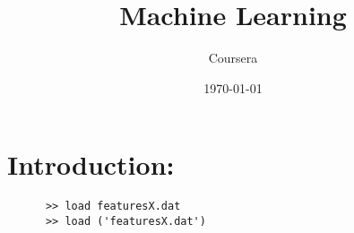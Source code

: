 \documentclass[11pt,a4paper]{article}
\begin{document}
\title{Machine Learning}
\author{Coursera}
\date{\today}
\maketitle


\section{Introduction:}

    \begin{lstlisting}
      >> load featuresX.dat
      >> load ('featuresX.dat')
    \end{lstlisting}




























\citet{Ross15}



\end{document}

